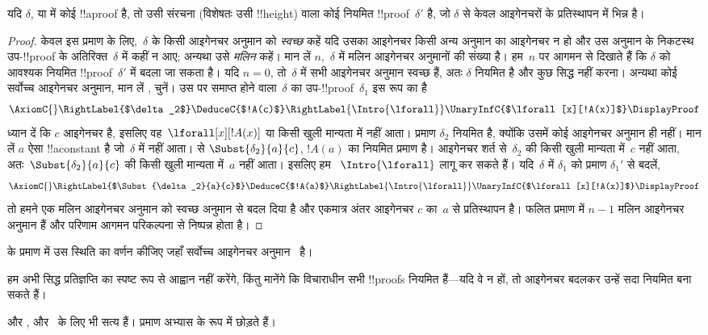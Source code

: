 \documentclass[../../../include/open-logic-section]{subfiles}
\begin{document}
\begin{prop}
यदि $\delta$,  या  में कोई !!a{proof} है, तो उसी संरचना
(विशेषतः उसी !!{height}) वाला कोई नियमित !!{proof}~$\delta'$ है, जो
$\delta$ से केवल आइगेनचरों के प्रतिस्थापन में भिन्न है।
\end{prop}

\begin{proof}
केवल इस प्रमाण के लिए,~$\delta$ के किसी आइगेनचर अनुमान को \emph{स्वच्छ}
कहें यदि उसका आइगेनचर किसी अन्य अनुमान का आइगेनचर न हो और उस अनुमान के
निकटस्थ उप-!!{proof} के अतिरिक्त~$\delta$ में कहीं न आए; अन्यथा उसे
\emph{मलिन} कहें। मान लें $n$,~$\delta$ में मलिन आइगेनचर अनुमानों की संख्या
है। हम~$n$ पर आगमन से दिखाते हैं कि $\delta$ को आवश्यक नियमित
!!{proof}~$\delta'$ में बदला जा सकता है। यदि $n=0$, तो~$\delta$ में सभी
आइगेनचर अनुमान स्वच्छ हैं, अतः $\delta$ नियमित है और कुछ सिद्ध नहीं करना।
अन्यथा कोई सर्वोच्च आइगेनचर अनुमान, मान लें \Intro{\lforall}, चुनें। उस पर
समाप्त होने वाला~$\delta$ का उप-!!{proof}~$\delta_1$ इस रूप का है
    \[
    \AxiomC{}
    \RightLabel{$\delta_2$}
    \DeduceC{$!A(c)$}
    \RightLabel{\Intro{\lforall}}
    \UnaryInfC{$\lforall[x][!A(x)]$}
    \DisplayProof
    \]
ध्यान दें कि $c$ आइगेनचर है, इसलिए वह~$\lforall[x][!A(x)]$ या किसी खुली
मान्यता में नहीं आता। प्रमाण $\delta_2$ नियमित है, क्योंकि उसमें कोई आइगेनचर
अनुमान ही नहीं। मान लें $a$ ऐसा !!a{constant} है जो~$\delta$ में नहीं आता।
 से $\Subst{\delta_2}{a}{c}$, $!A(a)$ का नियमित
प्रमाण है। आइगेनचर शर्त से~$\delta_2$ की किसी खुली मान्यता में~$c$ नहीं आता,
अतः~$\Subst{\delta_2}{a}{c}$ की किसी खुली मान्यता में~$a$ नहीं आता। इसलिए हम
~$\Intro{\lforall}$ लागू कर सकते हैं। यदि~$\delta$ में $\delta_1$ को प्रमाण
$\delta_1'$ से बदलें,
    \[
    \AxiomC{}
    \RightLabel{$\Subst{\delta_2}{a}{c}$}
    \DeduceC{$!A(a)$}
    \RightLabel{\Intro{\lforall}}
    \UnaryInfC{$\lforall[x][!A(x)]$}
    \DisplayProof
    \]
तो हमने एक मलिन आइगेनचर अनुमान को स्वच्छ अनुमान से बदल दिया है और एकमात्र
अंतर आइगेनचर $c$ का~$a$ से प्रतिस्थापन है। फलित प्रमाण में $n-1$ मलिन
आइगेनचर अनुमान हैं और परिणाम आगमन परिकल्पना से निष्पन्न होता है।
\end{proof}

\begin{prob}
 के प्रमाण में उस स्थिति का वर्णन कीजिए जहाँ सर्वोच्च
आइगेनचर अनुमान~\Elim{\lexists} है।
\end{prob}

हम अभी सिद्ध प्रतिज्ञप्ति का स्पष्ट रूप से आह्वान नहीं करेंगे, किंतु मानेंगे
कि विचाराधीन सभी !!{proof}s नियमित हैं---यदि वे न हों, तो आइगेनचर बदलकर
उन्हें सदा नियमित बना सकते हैं।

 और , 
और~ के लिए भी सत्य हैं। प्रमाण अभ्यास के रूप में छोड़ते हैं।
\end{document}
